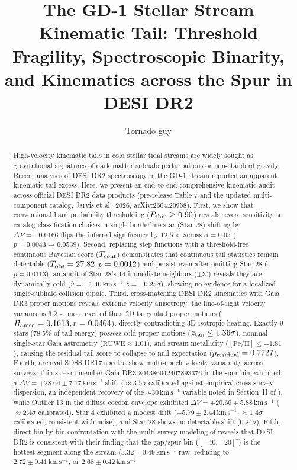 \documentclass[twocolumn]{aastex631}
\begin{document}
\title{The GD-1 Stellar Stream Kinematic Tail: Threshold Fragility, Spectroscopic Binarity, and Kinematics across the Spur in DESI DR2}

\author{Tornado guy}

\begin{abstract}
High-velocity kinematic tails in cold stellar tidal streams are widely sought as gravitational signatures of dark matter subhalo perturbations or non-standard gravity. Recent analyses of DESI DR2 spectroscopy in the GD-1 stream reported an apparent kinematic tail excess. Here, we present an end-to-end comprehensive kinematic audit across official DESI DR2 data products (pre-release Table 7 and the updated multi-component catalog, Jarvis et al.\ 2026, arXiv:2604.20958). First, we show that conventional hard probability thresholding ($P_{\rm thin} \ge 0.90$) reveals severe sensitivity to catalog classification choices: a single borderline star (Star 28) shifting by $\Delta P = -0.0166$ flips the inferred significance by $12.5\times$ across $\alpha = 0.05$ ($p = 0.0043 \to 0.0539$). Second, replacing step functions with a threshold-free continuous Bayesian score ($T_{\rm cont}$) demonstrates that continuous tail statistics remain detectable ($T_{\rm obs} = 27.82, p = 0.0012$) and persist even after omitting Star 28 ($p = 0.0113$); an audit of Star 28's 14 immediate neighbors ($\pm 3^\circ$) reveals they are dynamically cold ($\bar{v} = -1.40\,\mathrm{km\,s^{-1}}, \bar{z} = -0.25\sigma$), showing no evidence for a localized single-subhalo collision dipole. Third, cross-matching DESI DR2 kinematics with Gaia DR3 proper motions reveals extreme velocity anisotropy: the line-of-sight velocity variance is $6.2\times$ more excited than 2D tangential proper motions ($R_{\rm aniso} = 0.1613, r = 0.0464$), directly contradicting 3D isotropic heating. Exactly 9 stars (78.5\% of tail energy) possess cold proper motions ($z_{\rm tan} \le 1.36\sigma$), nominal single-star Gaia astrometry ($\mathrm{RUWE} \approx 1.01$), and stream metallicity ($\mathrm{[Fe/H]} \le -1.81$), causing the residual tail score to collapse to null expectation ($p_{\rm residual} = 0.7727$). Fourth, archival SDSS DR17 spectra show multi-epoch velocity variability across surveys: thin stream member Gaia DR3 804386042407893376 in the spur bin exhibited a $\Delta V = +28.64 \pm 7.17\,\mathrm{km\,s^{-1}}$ shift ($\approx 3.5\sigma$ calibrated against empirical cross-survey dispersion, an independent recovery of the $\sim 30\,\mathrm{km\,s^{-1}}$ variable noted in Section~II of \citealt{Nibauer2026}), while Outlier 13 in the diffuse cocoon envelope exhibited $\Delta V = +20.60 \pm 5.88\,\mathrm{km\,s^{-1}}$ ($\approx 2.4\sigma$ calibrated), Star 4 exhibited a modest drift ($-5.79 \pm 2.44\,\mathrm{km\,s^{-1}}, \approx 1.4\sigma$ calibrated, consistent with noise), and Star 28 shows no detectable shift ($0.24\sigma$). Fifth, direct bin-by-bin confrontation with the multi-survey modeling of \citet{Nibauer2026} reveals that DESI DR2 is consistent with their finding that the gap/spur bin ($[-40, -20]^\circ$) is the hottest segment along the stream ($3.32 \pm 0.49\,\mathrm{km\,s^{-1}}$ raw, reducing to $2.72 \pm 0.41\,\mathrm{km\,s^{-1}}$, or $2.68 \pm 0.42\,\mathrm{km\,s^{-1}}$ 
\end{abstract}
\end{document}
